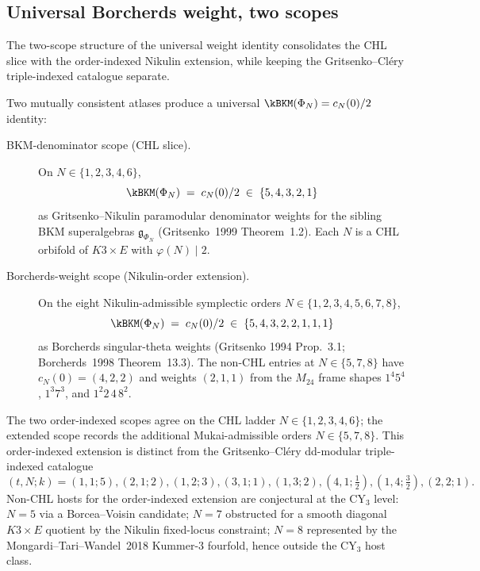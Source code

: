 \subsection{Universal Borcherds weight, two scopes}
\label{subsec:k3e-platonic-universal-weight}

The two-scope structure of the universal weight identity consolidates
the CHL slice with the order-indexed Nikulin extension, while keeping
the Gritsenko--Cl\'ery triple-indexed catalogue separate.

\begin{theorem}
\label{thm:plat-universal-kBKM}
Two mutually consistent atlases produce a universal $\kBKM(\Phi_N) = c_N(0)/2$ identity:
\begin{description}
\item[BKM-denominator scope (CHL slice).] On $N \in \{1, 2, 3, 4, 6\}$,
\[
 \kBKM(\Phi_N) \;=\; c_N(0)/2 \;\in\; \{5, 4, 3, 2, 1\}
\]
as Gritsenko--Nikulin paramodular denominator weights for the sibling BKM superalgebras $\mathfrak{g}_{\Phi_N}$ (Gritsenko~1999 Theorem~1.2). Each $N$ is a CHL orbifold of $K3 \times E$ with $\varphi(N) \mid 2$.
\item[Borcherds-weight scope (Nikulin-order extension).] On the
eight Nikulin-admissible symplectic orders $N \in \{1, 2, 3, 4, 5, 6, 7, 8\}$,
\[
 \kBKM(\Phi_N) \;=\; c_N(0)/2 \;\in\; \{5, 4, 3, 2, 2, 1, 1, 1\}
\]
as Borcherds singular-theta weights (Gritsenko 1994 Prop.~3.1;
Borcherds~1998 Theorem~13.3). The non-CHL entries at
$N \in \{5, 7, 8\}$ have $c_N(0)=(4,2,2)$ and weights $(2,1,1)$ from
the $M_{24}$ frame shapes $1^4 5^4$, $1^3 7^3$, and
$1^2 2\,4\,8^2$.
\end{description}
The two order-indexed scopes agree on the CHL ladder
$N \in \{1,2,3,4,6\}$; the extended scope records the additional
Mukai-admissible orders $N \in \{5,7,8\}$. This order-indexed
extension is distinct from the Gritsenko--Cl\'ery dd-modular
triple-indexed catalogue
\[
 (t,N;k)=
 (1,1;5),(2,1;2),(1,2;3),(3,1;1),(1,3;2),
 (4,1;\tfrac12),(1,4;\tfrac32),(2,2;1).
\]
Non-CHL hosts for the order-indexed extension are conjectural at the
CY$_3$ level: $N = 5$ via a Borcea--Voisin candidate; $N = 7$
obstructed for a smooth diagonal $K3 \times E$ quotient by the
Nikulin fixed-locus constraint; $N = 8$ represented by the
Mongardi--Tari--Wandel~2018 Kummer-$3$ fourfold, hence outside the
CY$_3$ host class.
\end{theorem}

